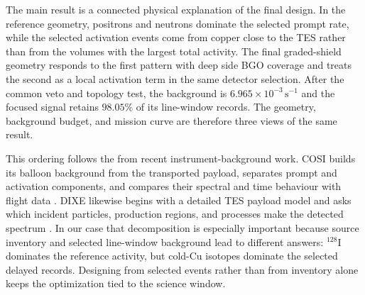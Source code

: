 \documentclass[11pt]{article}
\newcommand{\cps}{\ensuremath{\,\mathrm{s^{-1}}}}
\begin{document}
The main result is a connected physical explanation of the final design. In the
reference geometry, positrons and neutrons dominate the selected prompt rate, while
the selected activation events come from copper close to the TES rather than from
the volumes with the largest total activity. The final graded-shield geometry responds to the
first pattern with deep side BGO coverage and treats the second as a local activation
term in the same detector selection. After the common veto and topology test, the
background is $6.965\times10^{-3}\cps$ and the focused signal retains $98.05\%$
of its line-window records. The geometry, background budget, and mission curve are
therefore three views of the same result.

This ordering follows the  from recent instrument-background work.
COSI builds its balloon background from the transported payload, separates prompt
and activation components, and compares their spectral and time behaviour with
flight data \cite{Gallego2025Balloon}. DIXE likewise begins with a detailed TES
payload model and asks which incident particles, production regions, and processes
make the detected spectrum \cite{Tian2026DIXE}. In our case that decomposition is
especially important because source inventory and selected line-window background
lead to different answers: $^{128}$I dominates the reference activity, but cold-Cu
isotopes dominate the selected delayed records. Designing from selected events
rather than from inventory alone keeps the optimization tied to the science window.
\end{document}
